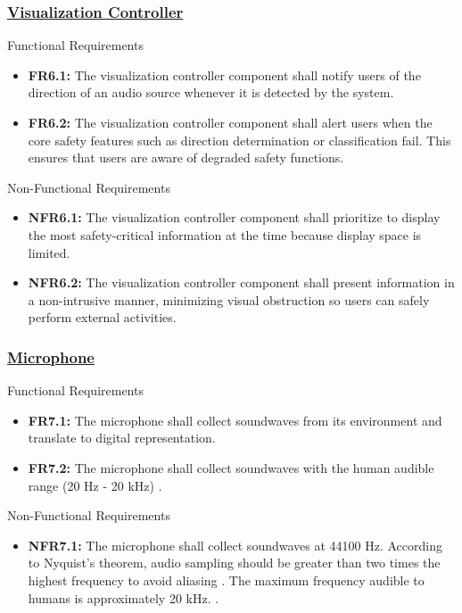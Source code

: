 \documentclass[12pt]{article}
\theoremstyle{definition}
\begin{document}
\subsubsection{\hyperref[comp:viz_controller]{Visualization Controller}}
Functional Requirements
\begin{itemize}
  \item \label{FR6_1}\textbf{FR6.1:} The visualization controller component
  shall notify users of the direction of an audio source whenever it is detected
  by the system.

  \item \label{FR6_2}\textbf{FR6.2:} The visualization controller component
  shall alert users when the core safety features such as direction
  determination or classification fail. This ensures that users are aware of
  degraded safety functions.
\end{itemize}

Non-Functional Requirements
\begin{itemize}
  \item \label{NFR6_1}\textbf{NFR6.1:} The visualization controller component
  shall prioritize to display the most safety-critical information at the time
  because display space is limited.
  \item \label{NFR6_2}\textbf{NFR6.2:} The visualization controller component
  shall present information in a non-intrusive manner, minimizing visual
  obstruction so users can safely perform external activities.
\end{itemize}

\subsubsection{\hyperref[comp:microphone]{Microphone}} Functional Requirements
\begin{itemize}
  \item \label{FR7_1}\textbf{FR7.1:} The microphone shall collect soundwaves
  from its environment and translate to digital representation.

  \item \label{FR7_2}\textbf{FR7.2:} The microphone shall collect soundwaves
  with the human audible range (20 Hz - 20 kHz) \cite{Neuroscience2001}.
\end{itemize}

Non-Functional Requirements
\begin{itemize}
  \item \label{NFR7_1}\textbf{NFR7.1:} The microphone shall collect soundwaves
  at 44100 Hz. According to Nyquist's theorem, audio sampling should be greater
  than two times the highest frequency to avoid aliasing \cite{DataForth2025}.
  The maximum frequency audible to humans is approximately 20 kHz.
  \cite{Neuroscience2001}.
\end{itemize}
\end{document}
